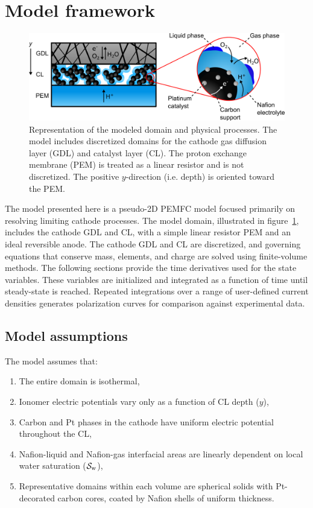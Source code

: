 \documentclass[final,3p,times,twocolumn]{elsarticle}    %
\begin{document}
\section{Model framework}
\label{sect:model-framework}

\begin{figure}
    \centering
    \includegraphics[width=5.825in]{figures/core-shell-5_825in.png}
    \caption{Representation of the modeled domain and physical processes. The model includes discretized domains for the cathode gas diffusion layer (GDL) and catalyst layer (CL). The proton exchange membrane (PEM) is treated as a linear resistor and is not discretized. The positive $y$-direction (i.e. depth) is oriented toward the PEM.}
    \label{fig:core-shell}
\end{figure}

The model presented here is a pseudo-2D PEMFC model focused primarily on resolving limiting cathode processes. The model domain, illustrated in figure~\ref{fig:core-shell}, includes the cathode GDL and CL, with a simple linear resistor PEM and an ideal reversible anode. The cathode GDL and CL are discretized, and governing equations that conserve mass, elements, and charge are solved using finite-volume methods. The following sections provide the time derivatives used for the state variables. These variables are initialized and integrated as a function of time until steady-state is reached. Repeated integrations over a range of user-defined current densities generates polarization curves for comparison against experimental data. 

\subsection{Model assumptions}\label{sec:assumptions}
The model assumes that:

\begin{enumerate}[label=(\roman*.)]
    \item The entire domain is isothermal,
    \item Ionomer electric potentials vary only as a function of CL depth ($y$),
    \item Carbon and Pt phases in the cathode have uniform electric potential throughout the CL,
    \item Nafion-liquid and Nafion-gas interfacial areas are linearly dependent on local water saturation (${\cal S}_{\rm w}$),
    \item Representative domains within each volume are spherical solids with Pt-decorated carbon cores, coated by Nafion shells of uniform thickness.
\end{enumerate}
\end{document}
